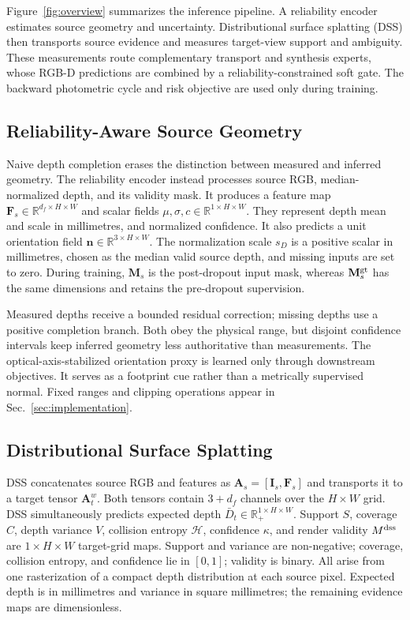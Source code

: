 \documentclass[letterpaper,10pt,conference]{ieeeconf}
\newcommand{\R}{\mathbb{R}}
\newcommand{\I}{\mathbf{I}}
\newcommand{\M}{\mathbf{M}}
\newcommand{\F}{\mathbf{F}}
\newcommand{\n}{\mathbf{n}}
\begin{document}
Figure~\ref{fig:overview} summarizes the inference pipeline. A
reliability encoder estimates source geometry and uncertainty. Distributional
surface splatting (DSS) then transports source evidence and measures target-view
support and ambiguity. These measurements route complementary transport and
synthesis experts, whose RGB-D predictions are combined by a
reliability-constrained soft gate. The backward photometric cycle and risk objective
are used only during training.

\subsection{Reliability-Aware Source Geometry}

Naive depth completion erases the distinction between measured and inferred
geometry. The reliability encoder instead processes source RGB,
median-normalized depth, and its validity mask. It produces a feature map
$\F_s\in\R^{d_f\times H\times W}$ and scalar fields
$\mu,\sigma,c\in\R^{1\times H\times W}$. They represent depth mean and scale
in millimetres, and normalized confidence. It also predicts a unit orientation field
$\n\in\R^{3\times H\times W}$. The normalization scale $s_D$ is a positive
scalar in millimetres, chosen as the median valid source depth, and missing
inputs are set to zero. During training, $\M_s$ is the post-dropout input mask,
whereas $\M_s^{\rm gt}$ has the same dimensions and retains the pre-dropout
supervision.

Measured depths receive a bounded residual correction; missing depths use a
positive completion branch. Both obey the physical range, but disjoint
confidence intervals keep inferred geometry less authoritative than
measurements. The optical-axis-stabilized orientation proxy is learned only
through downstream objectives. It serves as a footprint cue rather than a
metrically supervised normal. Fixed ranges and clipping operations appear in
Sec.~\ref{sec:implementation}.

\subsection{Distributional Surface Splatting}

DSS concatenates source RGB and features as $\mathbf A_s=[\I_s,\F_s]$ and
transports it to a target tensor $\mathbf A_t^w$. Both tensors contain $3+d_f$
channels over the $H\times W$ grid. DSS simultaneously predicts expected depth
$\bar D_t\in\R_+^{1\times H\times W}$. Support $S$, coverage
$C$, depth variance $V$, collision entropy $\mathcal H$, confidence $\kappa$,
and render validity $M^{\rm dss}$ are $1\times H\times W$ target-grid maps.
Support and variance are non-negative; coverage, collision entropy, and
confidence lie in $[0,1]$; validity is binary. All arise from one rasterization
of a compact depth distribution at each source pixel. Expected depth is in
millimetres and variance in square millimetres; the remaining evidence maps are
dimensionless.
\end{document}
